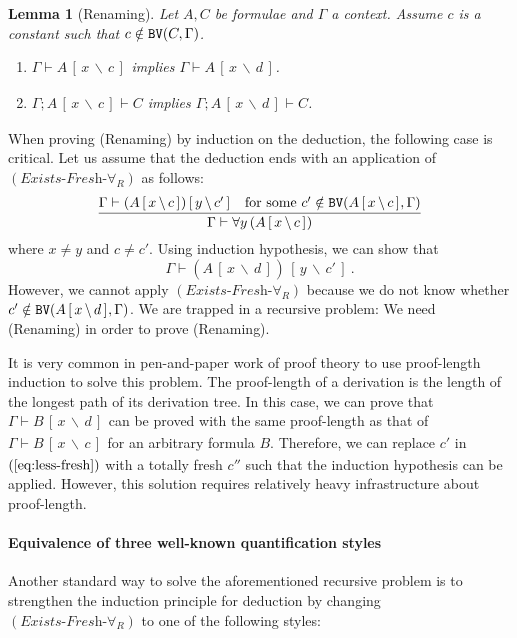 \documentclass{svjour3}                     %
\newtheorem{lem}[thm]{Lemma}
\newcommand{\seq}[2]{\infer{#2}{#1}}
\newcommand{\Ga}{\Gamma}
\newcommand{\vd}{\vdash}
\newcommand{\subst}[4]{#1\,[\,#2\, \backslash\, #3\,]_{#4}}
\newcommand{\scol}{\mathop{;}}
\newcommand{\tPH}{\textup{\tt BV}}
\begin{document}
\begin{lem}[Renaming]\label{renaming}
  Let $A, C$ be formulae and $\Ga$ a context. Assume $c$ is a constant such that $c \notin \tPH(C, \Ga)$. 
  \begin{enumerate}
  \item $\Ga \vd \subst{A}{x}{c}{}$ implies $\Ga \vd \subst{A}{x}{d}{}$.
  \item $\Ga \scol \subst{A}{x}{c}{} \vd C$ implies $\Ga \scol \subst{A}{x}{d}{} \vd C$.
  \end{enumerate}
\end{lem}

When proving (Renaming) by induction on the deduction, the following case is critical. Let us assume that the deduction ends with an application of $(\textit{Exists-Fresh-}\forall_R)$ as follows:
\[
\seq{\Ga \vd \subst{(\subst{A}{x}{c}{})}{y}{c'}{} & \text{for some } c' \notin \tPH(\subst{A}{x}{c}{}, \Ga)}{\Ga\vd  \forall y\, (\subst{A}{x}{c}{})}
\]
where $x \neq y$ and $c \neq c'$. 
Using induction hypothesis, we can show that
\begin{equation}
  \label{eq:less-fresh}
  \Ga \vd \subst{(\subst{A}{x}{d}{})}{y}{c'}{}\,.  
\end{equation}
However, we cannot apply $(\textit{Exists-Fresh-}\forall_R)$ because we do not know whether $c' \notin \tPH(\subst{A}{x}{d}{}, \Ga)$. We are trapped in a recursive problem: We need (Renaming) in order to prove (Renaming).


It is very common in pen-and-paper work of proof theory to use proof-length induction to solve this problem. The proof-length of a derivation is the length of the longest path of its derivation tree. In this case, we can prove that $\Ga \vd \subst{B}{x}{d}{}$ can be proved with the same proof-length as that of $\Ga \vd \subst{B}{x}{c}{}$ for an arbitrary formula $B$. Therefore, we can replace $c'$ in $(\ref{eq:less-fresh})$ with a totally fresh $c''$ such that the induction hypothesis can be applied. However, this solution requires relatively heavy infrastructure about proof-length.

\paragraph{\bf Equivalence of three well-known quantification styles} 
Another standard way to solve the aforementioned recursive problem is to strengthen the induction principle for deduction by changing $(\textit{Exists-Fresh-}\forall_R)$ to one of the following styles:
\end{document}
